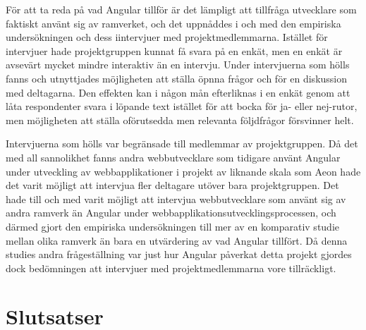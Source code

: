 För att ta reda på vad Angular tillför är det lämpligt att tillfråga utvecklare som faktiskt använt sig av ramverket, och det uppnåddes i och med den empiriska undersökningen och dess iintervjuer med projektmedlemmarna. Istället för intervjuer hade projektgruppen kunnat få svara på en enkät, men en enkät är avsevärt mycket mindre interaktiv än en intervju. Under intervjuerna som hölls fanns och utnyttjades möjligheten att ställa öpnna frågor och för en diskussion med deltagarna. Den effekten kan i någon mån efterliknas i en enkät genom att låta respondenter svara i löpande text istället för att bocka för ja- eller nej-rutor, men möjligheten att ställa oförutsedda men relevanta följdfrågor försvinner helt. 

Intervjuerna som hölls var begränsade till medlemmar av projektgruppen. Då det med all sannolikhet fanns andra webbutvecklare som tidigare använt Angular under utveckling av webbapplikationer i projekt av liknande skala som Aeon hade det varit möjligt att intervjua fler deltagare utöver bara projektgruppen. Det hade till och med varit möjligt att intervjua webbutvecklare som använt sig av andra ramverk än Angular under webbapplikationsutvecklingsprocessen, och därmed gjort den empiriska undersökningen till mer av en komparativ studie mellan olika ramverk än bara en utvärdering av vad Angular tillfört. Då denna studies andra frågeställning var just hur Angular påverkat detta projekt gjordes dock bedömningen att intervjuer med projektmedlemmarna vore tillräckligt.

\section{Slutsatser}

